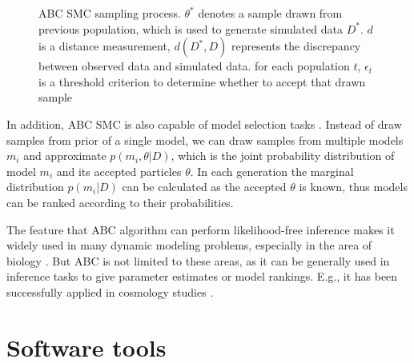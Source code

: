 \begin{figure}[t]
    \begin{center}
    \end{center}

    \caption[ABC SMC sampling process]%
    {ABC SMC sampling process. $\theta^*$ denotes a sample drawn from previous population, which is used to generate simulated data $D^*$. $d$ is a distance measurement, $d(D^*,D)$ represents the discrepancy between observed data and simulated data. for each population $t$, $\epsilon_t$ is a threshold criterion to determine whether to accept that drawn sample}
    \label{fig:smc}

\end{figure}

In addition, ABC SMC is also capable of model selection tasks \cite{model_compare}. Instead of draw samples from prior of a single model, we can draw samples from multiple models $m_i$ and approximate $p(m_i, \theta|D)$, which is the joint probability distribution of model $m_i$ and its accepted particles $\theta$. In each generation the marginal distribution $p(m_i|D)$ can be calculated as the accepted ${\theta}$ is known, thus models can be ranked according to their probabilities.

The feature that ABC algorithm can perform likelihood-free inference makes it widely used in many dynamic modeling problems, especially in the area of biology \cite{ref:abcsysbio, ref:disease, ref:compare}. But ABC is not limited to these areas, as it can be generally used in inference tasks to give parameter estimates or model rankings. E.g., it has been successfully applied in cosmology studies \cite{cosmology}.



\section{Software tools}


